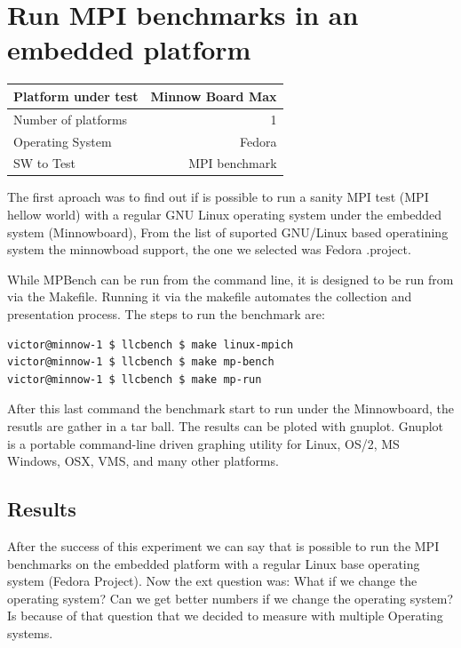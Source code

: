 \section{Run MPI benchmarks in an embedded platform}
    
    \begin{center}
    \begin{tabular}{ | l | r |}
        \hline
        Platform under test & Minnow Board  Max \\ \hline
        Number of platforms  & 1  \\ \hline
        Operating System & Fedora  \\ \hline
        SW to Test & MPI benchmark \\ \hline
    \end{tabular}
     \label{Sanity Sumary}
    \end{center}

The first aproach was to find out if is possible to run a sanity MPI test (MPI
hellow world) with a regular GNU Linux operating system under the embedded
system (Minnowboard\cite{minnowboard}),  From the list of suported GNU/Linux
based operatining system the minnowboad support, the one we selected was Fedora
\cite{fedora}.project. 


While MPBench can be run from the command line, it is designed to be run from
via the Makefile. Running it via the makefile automates the collection and
presentation process. The steps to run the benchmark are: 


\begin{lstlisting}[frame=single,language=bash]
victor@minnow-1 $ llcbench $ make linux-mpich
victor@minnow-1 $ llcbench $ make mp-bench
victor@minnow-1 $ llcbench $ make mp-run
\end{lstlisting}

After this last command the benchmark start to run under the Minnowboard, the
resutls are gather in a tar ball. The results can be ploted with gnuplot.
Gnuplot is a portable command-line driven graphing utility for Linux, OS/2, MS
Windows, OSX, VMS, and many other platforms. 

\subsection{Results}
After the success of this experiment we can say that is possible to run the MPI
benchmarks on the embedded platform with a regular Linux base operating system
(Fedora Project). Now the ext question was: What if we change the operating
system? Can we get better numbers if we change the operating system? Is because
of that question that we decided to measure with multiple Operating systems.


